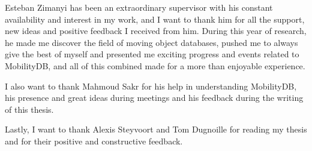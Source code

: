 Esteban Zimanyi has been an extraordinary supervisor with his constant availability and interest in my work, and I want to thank him for all the support, new ideas and positive feedback I received from him. During this year of research, he made me discover the field of moving object databases, pushed me to always give the best of myself and presented me exciting progress and events related to MobilityDB, and all of this combined made for a more than enjoyable experience.

I also want to thank Mahmoud Sakr for his help in understanding MobilityDB, his presence and great ideas during meetings and his feedback during the writing of this thesis.

Lastly, I want to thank Alexis Steyvoort and Tom Dugnoille for reading my thesis and for their positive and constructive feedback.